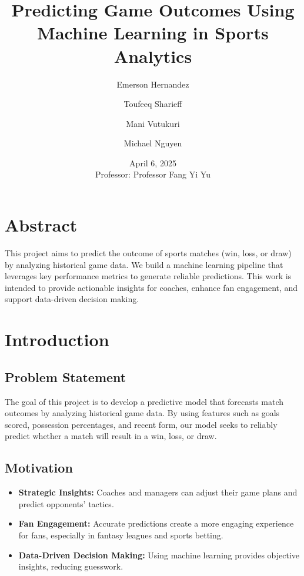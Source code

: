\documentclass[a4paper,12pt]{article}
\title{Predicting Game Outcomes Using Machine Learning in Sports Analytics}
\author{Emerson Hernandez \and Toufeeq Sharieff \and Mani Vutukuri \and Michael Nguyen}
\date{April 6, 2025\\Professor: Professor Fang Yi Yu}
\begin{document}
\maketitle
\tableofcontents
\newpage

\section*{Abstract}
This project aims to predict the outcome of sports matches (win, loss, or draw) by analyzing historical game data. We build a machine learning pipeline that leverages key performance metrics to generate reliable predictions. This work is intended to provide actionable insights for coaches, enhance fan engagement, and support data-driven decision making.

\section{Introduction}
\subsection{Problem Statement}
The goal of this project is to develop a predictive model that forecasts match outcomes by analyzing historical game data. By using features such as goals scored, possession percentages, and recent form, our model seeks to reliably predict whether a match will result in a win, loss, or draw.

\subsection{Motivation}
\begin{itemize}
    \item \textbf{Strategic Insights:} Coaches and managers can adjust their game plans and predict opponents’ tactics.
    \item \textbf{Fan Engagement:} Accurate predictions create a more engaging experience for fans, especially in fantasy leagues and sports betting.
    \item \textbf{Data-Driven Decision Making:} Using machine learning provides objective insights, reducing guesswork.
\end{itemize}
\end{document}
